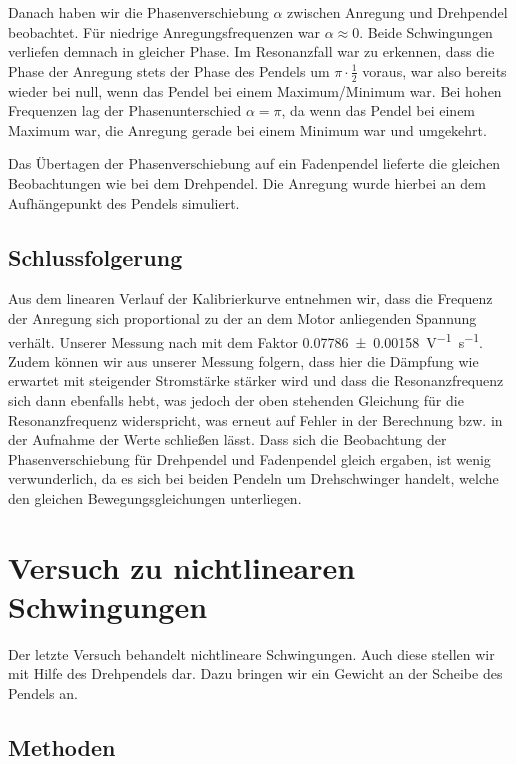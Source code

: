 \documentclass[11pt,a4paper,titlepage, ngerman]{article}
\begin{document}
			Danach haben wir die Phasenverschiebung $\alpha$ zwischen Anregung und Drehpendel beobachtet. Für niedrige Anregungsfrequenzen war $\alpha \approx 0$. Beide Schwingungen verliefen demnach in gleicher Phase. Im Resonanzfall war zu erkennen, dass die Phase der Anregung stets der Phase des Pendels um $\pi\cdot\frac{1}{2}$ voraus, war also bereits wieder bei null, wenn das Pendel bei einem Maximum/Minimum war. Bei hohen Frequenzen lag der Phasenunterschied $\alpha = \pi$, da wenn das Pendel bei einem Maximum war, die Anregung gerade bei einem Minimum war und umgekehrt.
			
			Das Übertagen der Phasenverschiebung auf ein Fadenpendel lieferte die gleichen Beobachtungen wie bei dem Drehpendel. Die Anregung wurde hierbei an dem Aufhängepunkt des Pendels simuliert.   
			
		\subsection*{Schlussfolgerung}
			
			Aus dem linearen Verlauf der Kalibrierkurve entnehmen wir, dass die Frequenz der Anregung sich proportional zu der an dem Motor anliegenden Spannung verhält. Unserer Messung nach mit dem Faktor \SI{0,07786+-0,00158}{\V^{-1}\s^{-1}}.
			Zudem können wir aus unserer Messung folgern, dass hier die Dämpfung wie erwartet mit steigender Stromstärke stärker wird und dass die Resonanzfrequenz sich dann ebenfalls hebt, was jedoch der oben stehenden Gleichung für die Resonanzfrequenz widerspricht, was erneut auf Fehler in der Berechnung bzw. in der Aufnahme der Werte schließen lässt.
			Dass sich die Beobachtung der Phasenverschiebung für Drehpendel und Fadenpendel gleich ergaben, ist wenig verwunderlich, da es sich bei beiden Pendeln um Drehschwinger handelt, welche den gleichen Bewegungsgleichungen unterliegen.
			
	\section{Versuch zu nichtlinearen Schwingungen}
	
		Der letzte Versuch behandelt nichtlineare Schwingungen. Auch diese stellen wir mit Hilfe des Drehpendels dar. Dazu bringen wir ein Gewicht an der Scheibe des Pendels an.
		
		\subsection*{Methoden}
				
\end{document}
